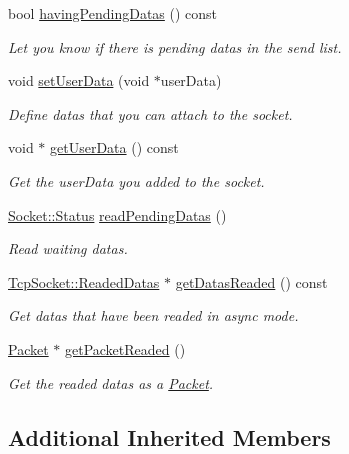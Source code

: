 \begin{DoxyCompactItemize}
bool \hyperlink{classmognetwork_1_1_tcp_socket_aff17b683f622b017876751d9cbbad3bb}{having\-Pending\-Datas} () const 
\begin{DoxyCompactList}\small\item\em Let you know if there is pending datas in the send list. \end{DoxyCompactList}\item 
void \hyperlink{classmognetwork_1_1_tcp_socket_a2d7327be349e705c74bdc6b40c1b2520}{set\-User\-Data} (void $\ast$user\-Data)
\begin{DoxyCompactList}\small\item\em Define datas that you can attach to the socket. \end{DoxyCompactList}\item 
void $\ast$ \hyperlink{classmognetwork_1_1_tcp_socket_adef63a929423324fd75888e2195176e0}{get\-User\-Data} () const 
\begin{DoxyCompactList}\small\item\em Get the user\-Data you added to the socket. \end{DoxyCompactList}\item 
\hyperlink{classmognetwork_1_1_socket_aa187a8394ac0d6203af0ec7f021ca15f}{Socket\-::\-Status} \hyperlink{classmognetwork_1_1_tcp_socket_af3918374ee41223b77f669367d4b0e22}{read\-Pending\-Datas} ()
\begin{DoxyCompactList}\small\item\em Read waiting datas. \end{DoxyCompactList}\item 
\hyperlink{structmognetwork_1_1_tcp_socket_1_1_readed_datas}{Tcp\-Socket\-::\-Readed\-Datas} $\ast$ \hyperlink{classmognetwork_1_1_tcp_socket_a6dbe149a276fb24203267762fbd1c276}{get\-Datas\-Readed} () const 
\begin{DoxyCompactList}\small\item\em Get datas that have been readed in async mode. \end{DoxyCompactList}\item 
\hyperlink{classmognetwork_1_1_packet}{Packet} $\ast$ \hyperlink{classmognetwork_1_1_tcp_socket_ac8619a5f869abfda7b8c2d32c94870f3}{get\-Packet\-Readed} ()
\begin{DoxyCompactList}\small\item\em Get the readed datas as a \hyperlink{classmognetwork_1_1_packet}{Packet}. \end{DoxyCompactList}\end{DoxyCompactItemize}
\subsection*{Additional Inherited Members}


